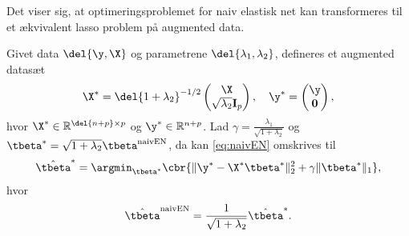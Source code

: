 %
Det viser sig, at optimeringsproblemet for naiv elastisk net kan transformeres til et ækvivalent lasso problem på augmented data.
%
\begin{lem} \label{lem:elastisk_net}
Givet data \(\del{\y, \X}\) og parametrene \(\del{\lambda_1, \lambda_2}\), defineres et augmented datasæt 
\begin{align*}
\X^* = \del{1 + \lambda_2}^{-1/2} \begin{pmatrix}
\X \\ \sqrt{\lambda_2} \mathbf{I}_p
\end{pmatrix}, \quad \y^* = \begin{pmatrix}
\y \\ \mathbf{0}
\end{pmatrix},
\end{align*}
hvor \(\X^* \in \mathbb{R}^{\del{n+p} \times p}\) og \(\y^* \in \mathbb{R}^{n+p}\).
Lad \(\gamma = \frac{\lambda_1}{\sqrt{1+\lambda_2}}\) og \(\tbeta^* = \sqrt{1+\lambda_2} \tbeta^\text{naivEN}\), da kan \eqref{eq:naivEN} omskrives til
\begin{align}
\hat{\tbeta}^* = \argmin_{\tbeta^*} \cbr{ \Vert \y^* - \X^* \tbeta^* \Vert_2^2 +\gamma \Vert \tbeta^* \Vert_1}, \label{eq:EN11}
\end{align}
hvor
\begin{align*}
\hat{\tbeta}^\text{naivEN} = \frac{1}{\sqrt{1+\lambda_2}} \hat{\tbeta}^*.
\end{align*}
\end{lem}
%
